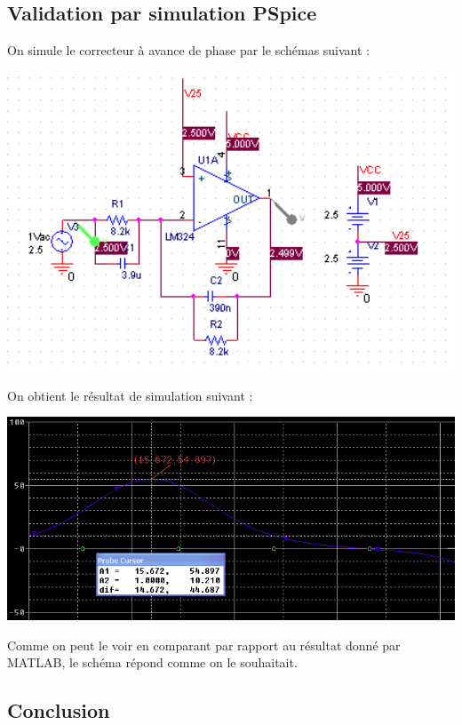 \documentclass[11pt, french]{article} %
\begin{document}
\subsection{Validation par simulation PSpice}

On simule le correcteur à avance de phase par le schémas suivant : 

\begin{center}
\includegraphics[width = 15cm]{SolutionAnalogique/schAvph.png} 
\end{center}

On obtient le résultat de simulation suivant : 

\begin{center}
\includegraphics[width = 15cm]{SolutionAnalogique/simuAvph.png} 
\end{center}

Comme on peut le voir en comparant par rapport au résultat donné par MATLAB, le schéma répond comme on le souhaitait. 

\vspace{0.5cm}
\subsection{Conclusion}
\end{document}
